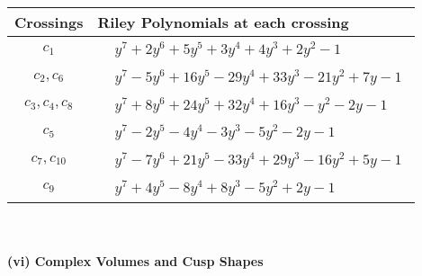 \documentclass[1p]{elsarticle_modified}
\theoremstyle{definition}
\begin{document}
\begin{tabular}{m{50pt}|m{274pt}}
Crossings & \hspace{64pt}Riley Polynomials at each crossing \\
\hline $$\begin{aligned}c_{1}\end{aligned}$$&$\begin{aligned}
&y^7+2 y^6+5 y^5+3 y^4+4 y^3+2 y^2-1
\end{aligned}$\\
\hline $$\begin{aligned}c_{2},c_{6}\end{aligned}$$&$\begin{aligned}
&y^7-5 y^6+16 y^5-29 y^4+33 y^3-21 y^2+7 y-1
\end{aligned}$\\
\hline $$\begin{aligned}c_{3},c_{4},c_{8}\end{aligned}$$&$\begin{aligned}
&y^7+8 y^6+24 y^5+32 y^4+16 y^3- y^2-2 y-1
\end{aligned}$\\
\hline $$\begin{aligned}c_{5}\end{aligned}$$&$\begin{aligned}
&y^7-2 y^5-4 y^4-3 y^3-5 y^2-2 y-1
\end{aligned}$\\
\hline $$\begin{aligned}c_{7},c_{10}\end{aligned}$$&$\begin{aligned}
&y^7-7 y^6+21 y^5-33 y^4+29 y^3-16 y^2+5 y-1
\end{aligned}$\\
\hline $$\begin{aligned}c_{9}\end{aligned}$$&$\begin{aligned}
&y^7+4 y^5-8 y^4+8 y^3-5 y^2+2 y-1
\end{aligned}$\\
\hline
\end{tabular}\\~\\
\newpage\flushleft \textbf{(vi) Complex Volumes and Cusp Shapes}
\end{document}
